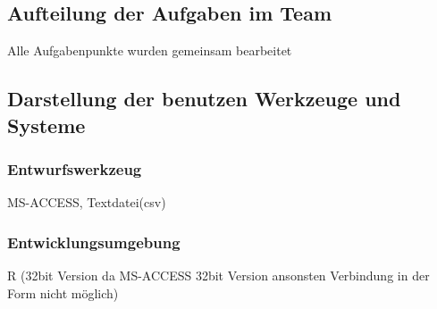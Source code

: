 \subsection*{Aufteilung der Aufgaben im Team}
Alle Aufgabenpunkte wurden gemeinsam bearbeitet
\subsection*{Darstellung der benutzen Werkzeuge und Systeme}
\subsubsection*{Entwurfswerkzeug}
MS-ACCESS, Textdatei(csv)
\subsubsection*{Entwicklungsumgebung}
R (32bit Version da MS-ACCESS 32bit Version ansonsten Verbindung in der Form nicht möglich)

